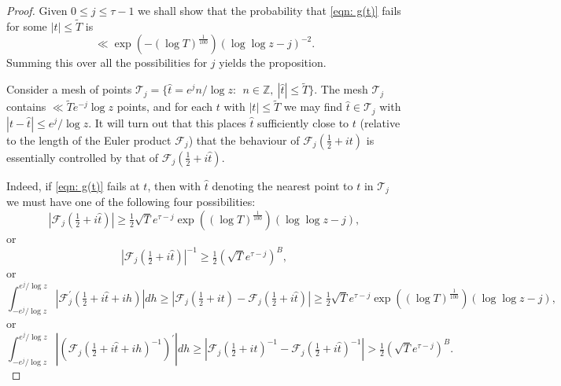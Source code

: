 \documentclass[10pt,a4paper]{amsart}
\def\TT{\widetilde{T}}
\begin{document}
\begin{proof}   Given $0\le j\le \tau -1$  we shall show that the probability that \eqref{eqn: g(t)} fails for some $|t| \le \TT$ is  
$$ 
\ll \exp(-(\log T)^{\frac 1{100}}) (\log \log z -j)^{-2}.  
$$
Summing this over all the possibilities for $j$ yields the proposition.  

Consider a mesh of points ${\mathcal T}_j = \{ {\widehat t} = e^{j} n/\log z :\ \ n\in {\mathbb Z}, \ |{\widehat t}| \le \TT\}$.  The mesh ${\mathcal T}_j$ contains $\ll \TT e^{-j} \log z$ points, and for each $t$ with $|t|\le \TT$ we may find ${\widehat t} \in {\mathcal T}_j$ with $|t-{\widehat t}| \le e^{j}/\log z$. It will turn out that this places ${\widehat t}$ sufficiently close to $t$ (relative to the length of the Euler product ${\mathcal F}_{j}$) that the behaviour of ${\mathcal F}_j(\tfrac 12 +it)$ is essentially controlled by that of ${\mathcal F}_j(\tfrac 12 +i{\widehat t})$.

Indeed, if \eqref{eqn: g(t)} fails at $t$, then with ${\widehat t}$ denoting the nearest point to $t$ in ${\mathcal T}_j$ we must have one of the following four possibilities: 
\begin{equation} 
\label{3.8} 
|{\mathcal F}_j(\tfrac 12 +i{\widehat t})| \ge \tfrac 12 \sqrt{T} e^{\tau-j} \exp((\log T)^{\frac 1{100}}) (\log \log z - j), 
\end{equation} 
or 
\begin{equation} 
\label{3.9} |{\mathcal F}_j(\tfrac 12 + i{\widehat t})|^{-1} \ge \tfrac 12 (\sqrt{T} e^{\tau-j})^B, 
\end{equation} 
or 
\begin{equation} 
\label{3.10} 
\int_{-e^{j}/\log z}^{e^{j}/\log z} |{\mathcal F}_j^{\prime}(\tfrac 12+i{\widehat t} +ih)| dh 
\ge |{\mathcal F}_j(\tfrac 12+it)-{\mathcal F}_j(\tfrac 12+i{\widehat t})| \ge \tfrac 12 \sqrt{T} e^{\tau-j} \exp((\log T)^{\frac 1{100}}) (\log \log z - j), 
\end{equation}
or 
\begin{equation} 
\label{3.11} 
\int_{-e^{j}/\log z}^{e^{j}/\log z} |({\mathcal F}_j(\tfrac 12+i{\widehat t} +ih)^{-1})^{\prime}| dh 
\ge  |{\mathcal F}_j(\tfrac 12+it)^{-1} - {\mathcal F}_j(\tfrac 12 +i{\widehat t})^{-1} |  > \tfrac 12  (\sqrt{T}e^{\tau-j})^{B}. 
\end{equation} 


\end{proof}
\end{document}
